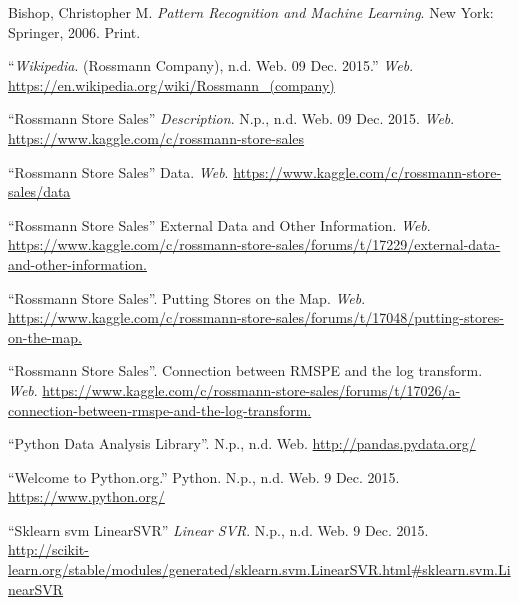 \documentclass[12pt,a4paper]{article}
\begin{document}
\begin{thebibliography}{9}
	
	Bishop, Christopher M. \textit{Pattern Recognition and Machine Learning}. New York: Springer, 2006. Print.
	
	\enquote{\textit{Wikipedia}. (Rossmann Company), n.d. Web. 09 Dec. 2015.} \textit{Web}. \href{https://en.wikipedia.org/wiki/Rossmann_(company)}{\url{https://en.wikipedia.org/wiki/Rossmann_(company)}}
	
	\enquote{Rossmann Store Sales} \textit{Description}. N.p., n.d. Web. 09 Dec. 2015. \textit{Web}. \href{https://www.kaggle.com/c/rossmann-store-sales}{\url{https://www.kaggle.com/c/rossmann-store-sales}}
	
	\enquote{Rossmann Store Sales} Data. \textit{Web}. \href{https://www.kaggle.com/c/rossmann-store-sales/data}{\url{https://www.kaggle.com/c/rossmann-store-sales/data}}
	
	\enquote{Rossmann Store Sales} External Data and Other Information. \textit{Web}. \href{https://www.kaggle.com/c/rossmann-store-sales/forums/t/17229/external-data-and-other-information.}{\url{https://www.kaggle.com/c/rossmann-store-sales/forums/t/17229/external-data-and-other-information.
	}}
	
	\enquote{Rossmann Store Sales}. Putting Stores on the Map. \textit{Web}. \href{https://www.kaggle.com/c/rossmann-store-sales/forums/t/17048/putting-stores-on-the-map.}{\url{https://www.kaggle.com/c/rossmann-store-sales/forums/t/17048/putting-stores-on-the-map.}}
	
	\enquote{Rossmann Store Sales}. Connection between RMSPE and the log transform. \textit{Web}. \href{https://www.kaggle.com/c/rossmann-store-sales/forums/t/17026/a-connection-between-rmspe-and-the-log-transform.}{\url{https://www.kaggle.com/c/rossmann-store-sales/forums/t/17026/a-connection-between-rmspe-and-the-log-transform.}}
	
	\enquote{Python Data Analysis Library}. N.p., n.d. Web. 
	\href{http://pandas.pydata.org/}{\url{http://pandas.pydata.org/}}
	
	\enquote{Welcome to Python.org.} Python. N.p., n.d. Web. 9 Dec. 2015. 
	\href{https://www.python.org/}{\url{https://www.python.org/}}
	
	\enquote{Sklearn svm LinearSVR} \textit{Linear SVR}. N.p., n.d. Web. 9 Dec. 2015. \href{http://scikit-learn.org/stable/modules/generated/sklearn.svm.LinearSVR.html\#sklearn.svm.LinearSVR}{\url{http://scikit-learn.org/stable/modules/generated/sklearn.svm.LinearSVR.html\#sklearn.svm.LinearSVR}}
	

\end{thebibliography}
\end{document}
